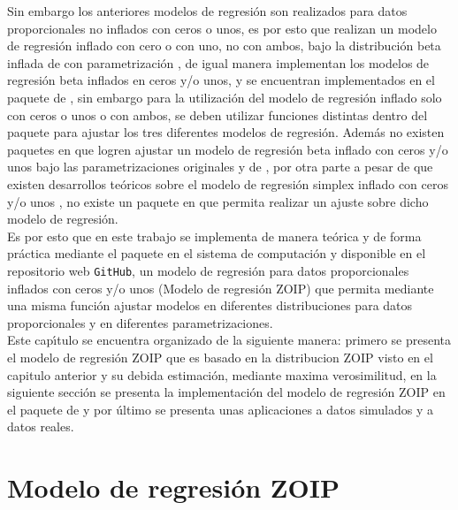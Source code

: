 Sin embargo los anteriores modelos de regresi\'{o}n son realizados para datos proporcionales no inflados con ceros o unos, es por esto que \cite{Ospina1} realizan un modelo de regresi\'{o}n inflado con cero o con uno, no con ambos, bajo la distribuci\'{o}n beta inflada de \cite{Ospina2} con parametrizaci\'{o}n \cite{Ferrari2}, de igual manera \cite{Stasinopoulos2} implementan los modelos de regresi\'{o}n beta inflados en ceros y/o unos, y se encuentran implementados en el paquete  de  \citep{Stasinopoulos1}, sin embargo para la utilizaci\'{o}n del modelo de regresi\'{o}n inflado solo con ceros o unos o con ambos, se deben utilizar funciones distintas dentro del paquete para ajustar los tres diferentes modelos de regresi\'{o}n. Adem\'{a}s no existen paquetes en  que logren ajustar un modelo de regresi\'{o}n beta inflado con ceros y/o unos bajo las parametrizaciones originales y de \cite{Ferrari2}, por otra parte a pesar de que existen desarrollos te\'{o}ricos sobre el modelo de regresi\'{o}n simplex inflado con ceros y/o unos \citep{Galvis1}, no existe un paquete en  que permita realizar un ajuste sobre dicho modelo de regresi\'{o}n.\\

Es por esto que en este trabajo se implementa de manera te\'{o}rica y de forma pr\'{a}ctica mediante el paquete  en el sistema de computaci\'{o}n  \citep{R} y disponible en el repositorio web \verb|GitHub|, un modelo de regresi\'{o}n para datos proporcionales inflados con ceros y/o unos (Modelo de regresi\'{o}n ZOIP) que permita mediante una misma funci\'{o}n ajustar modelos en diferentes distribuciones para datos proporcionales y en diferentes parametrizaciones.\\

Este cap\'{\i}tulo se encuentra organizado de la siguiente manera: primero se presenta el modelo de regresi\'{o}n ZOIP que es basado en la distribucion ZOIP visto en el capitulo anterior y su debida estimaci\'{o}n, mediante maxima verosimilitud, en la siguiente secci\'{o}n se presenta la implementaci\'{o}n del modelo de regresi\'{o}n ZOIP en el paquete  de  y por \'{u}ltimo se presenta unas aplicaciones a datos simulados y a datos reales.


\section{Modelo de regresi\'{o}n ZOIP}

